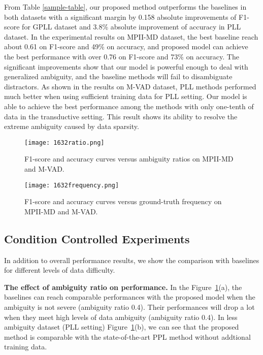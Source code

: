 \documentclass[letterpaper]{article} \usepackage{aaai20}  \usepackage{times}  \usepackage{helvet} \usepackage{courier}  \usepackage[hyphens]{url}  \usepackage{graphicx} \urlstyle{rm} \def\UrlFont{\rm}  \frenchspacing  \setlength{\pdfpagewidth}{8.5in}  \setlength{\pdfpageheight}{11in}  \frenchspacing
\begin{document}
From Table \ref{sample-table}, our proposed method outperforms the baselines in both datasets with a significant margin by 0.158 absolute improvements of F1-score for GPLL dataset and 3.8\% absolute improvement of accuracy in PLL dataset. In the experimental results on MPII-MD dataset, the best baseline reach about 0.61 on F1-score and 49\% on accuracy, and proposed model can achieve the best performance with over 0.76 on F1-score and 73\% on accuracy. The significant improvements show that our model is powerful enough to deal with generalized ambiguity, and the baseline methods will fail to disambiguate distractors. As shown in the results on M-VAD dataset, PLL methods performed much better when using sufficient training data for PLL setting. Our model is able to achieve the best performance among the methods with only one-tenth of data in the transductive setting. This result shows its ability to resolve the extreme ambiguity caused by data sparsity.


\begin{figure}[!th]
 \centering
  \texttt{[image: 1632ratio.png]}
\caption{F1-score and accuracy curves versus ambiguity ratios on MPII-MD and M-VAD. }
  \label{fig:ratio}
\end{figure}


\begin{figure}[!th]
\centering
 
  \texttt{[image: 1632frequency.png]}
  \caption{F1-score and accuracy curves versus ground-truth frequency on MPII-MD and M-VAD.}
  \label{fig:freq}
\end{figure}


\subsection{Condition Controlled Experiments}


In addition to overall performance results, we show the comparison with baselines for different levels of data difficulty. 

\noindent\textbf{The effect of ambiguity ratio on performance.}
In the Figure~\ref{fig:ratio}(a), the baselines can reach comparable performances with the proposed model when the ambiguity is not severe (ambiguity ratio  0.4). Their performances will drop a lot when they meet high levels of data ambiguity (ambiguity ratio  0.4). In less ambiguity dataset (PLL setting) Figure~\ref{fig:ratio}(b), we can see that the proposed method is comparable with the state-of-the-art PPL method without addtional training data. 
\end{document}

